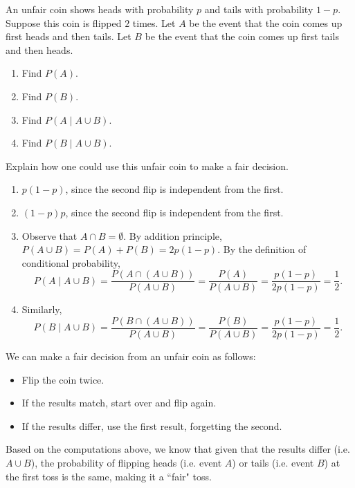 \documentclass{article}
\theoremstyle{definition}
\begin{document}
\begin{question}
    An unfair coin shows heads with probability $p$ and tails with probability
    $1-p$. Suppose this coin is flipped $2$ times. Let $A$ be the event that the coin comes up first heads and
    then tails.  Let $B$ be the event that the coin comes up first tails and
    then heads.
    \begin{enumerate}
        \item  Find $P(A)$.
        \item  Find $P(B)$.
        \item  Find $P(A \mid A \cup B)$.
        \item  Find $P(B \mid A \cup B)$.
    \end{enumerate}
    Explain how one could use this unfair coin to make a fair decision.
\end{question}
\begin{solution}
    \begin{enumerate}
        \item $p(1-p)$, since the second flip is independent from the first.
        \item $(1-p)p$, since the second flip is independent from the first.
        \item Observe that $A \cap B = \emptyset$.  By addition principle, $P(A
        \cup B) = P(A )+ P(B) = 2p(1-p)$. By the definition of conditional
        probability,
            \[
                P(A \mid A \cup B) = \frac{P(A \cap (A \cup B))}{P(A\cup B)}
                = \frac{P(A)}{P(A\cup B)} = \frac{p(1-p)}{2p(1-p)} = \frac{1}{2}.
            \]
        \item Similarly,
            \[
                P(B  \mid  A \cup B) = \frac{P(B \cap (A \cup B))}{P(A\cup B)}
                    = \frac{P(B)}{P(A\cup B)} = \frac{p(1-p)}{2p(1-p)} = \frac{1}{2}.
            \]
    \end{enumerate}
    We can make a fair decision from an unfair coin as follows:
    \begin{itemize}
        \item Flip the coin twice.
        \item If the results match, start over and flip again.
        \item If the results differ, use the first result, forgetting the second.
    \end{itemize}
    Based on the computations above, we know that given that the results differ
    (i.e. $A\cup B$), the probability of flipping heads (i.e. event $A$) or
    tails (i.e. event $B$) at the first toss is the same, making it a ``fair"
    toss.
\end{solution}
\end{document}
